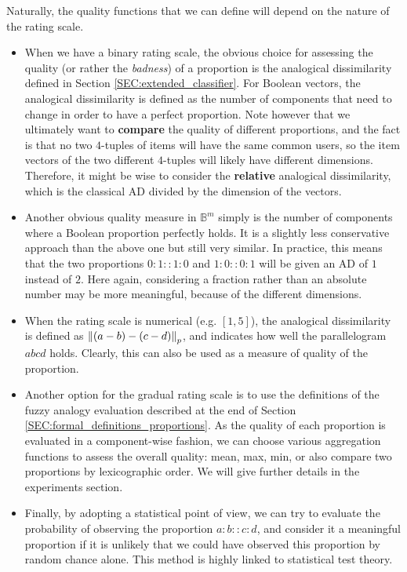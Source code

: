 Naturally, the quality functions that we can define will depend on the nature
of the rating scale.

\begin{itemize}
  \item When we have a binary rating scale, the obvious choice for assessing
    the quality (or rather the \textit{badness}) of a proportion is the
    analogical dissimilarity defined in Section \ref{SEC:extended_classifier}. For Boolean
    vectors, the analogical dissimilarity is defined as the number of
    components that need to change in order to have a perfect proportion. Note
    however that we ultimately want to \textbf{compare} the quality of
    different proportions, and the fact is that no two $4$-tuples of items will
    have the same common users, so the item vectors of the two different
    $4$-tuples will likely have different dimensions. Therefore, it might be
    wise to consider the \textbf{relative} analogical dissimilarity, which is
    the classical AD divided by the dimension of the vectors.
  \item Another obvious quality measure in $\mathbb{B}^m$ simply is the number
    of components where a Boolean proportion perfectly holds. It is a slightly
    less conservative approach than the above one but still very similar. In
    practice, this means that the two proportions $0:1::1:0$ and $1:0::0:1$
    will be given an AD of $1$ instead of $2$. Here again, considering a
    fraction rather than an absolute number may be more meaningful, because
    of the different dimensions.
  \item When the rating scale is numerical (e.g. $[1, 5]$), the analogical dissimilarity is
    defined as $\norm{p}{(a - b) - (c - d)}$, and indicates how well the
    parallelogram $abcd$ holds. Clearly, this can also be used as a measure of
    quality of the proportion.
  \item Another option for the gradual rating scale is to use the definitions
    of the fuzzy analogy evaluation described at the end of Section
    \ref{SEC:formal_definitions_proportions}. As the quality of each proportion is
    evaluated in a component-wise fashion, we can choose various aggregation
    functions to assess the overall quality: mean, max, min, or also compare
    two proportions by lexicographic order. We will give further details in the
    experiments section.
  \item Finally, by adopting a statistical point of view, we can try to
    evaluate the probability of observing the proportion $a:b::c:d$, and
    consider it a meaningful proportion if it is unlikely that we could have
    observed this proportion by random chance alone. This method is highly
    linked to statistical test theory.
\end{itemize}

